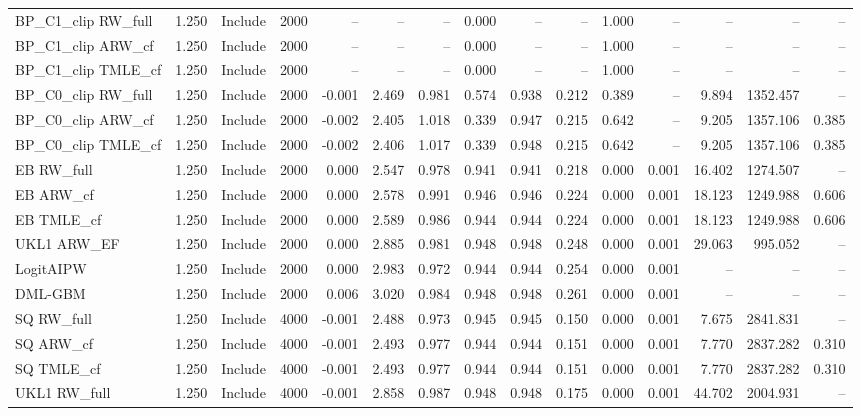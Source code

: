 \begin{tabular}{llllrrrrrrrrrrr}
BP\_C1\_clip RW\_full & 1.250 & Include & 2000 & -- & -- & -- & 0.000 & -- & -- & 1.000 & -- & -- & -- & -- \\
BP\_C1\_clip ARW\_cf & 1.250 & Include & 2000 & -- & -- & -- & 0.000 & -- & -- & 1.000 & -- & -- & -- & -- \\
BP\_C1\_clip TMLE\_cf & 1.250 & Include & 2000 & -- & -- & -- & 0.000 & -- & -- & 1.000 & -- & -- & -- & -- \\
BP\_C0\_clip RW\_full & 1.250 & Include & 2000 & -0.001 & 2.469 & 0.981 & 0.574 & 0.938 & 0.212 & 0.389 & -- & 9.894 & 1352.457 & -- \\
BP\_C0\_clip ARW\_cf & 1.250 & Include & 2000 & -0.002 & 2.405 & 1.018 & 0.339 & 0.947 & 0.215 & 0.642 & -- & 9.205 & 1357.106 & 0.385 \\
BP\_C0\_clip TMLE\_cf & 1.250 & Include & 2000 & -0.002 & 2.406 & 1.017 & 0.339 & 0.948 & 0.215 & 0.642 & -- & 9.205 & 1357.106 & 0.385 \\
EB RW\_full & 1.250 & Include & 2000 & 0.000 & 2.547 & 0.978 & 0.941 & 0.941 & 0.218 & 0.000 & 0.001 & 16.402 & 1274.507 & -- \\
EB ARW\_cf & 1.250 & Include & 2000 & 0.000 & 2.578 & 0.991 & 0.946 & 0.946 & 0.224 & 0.000 & 0.001 & 18.123 & 1249.988 & 0.606 \\
EB TMLE\_cf & 1.250 & Include & 2000 & 0.000 & 2.589 & 0.986 & 0.944 & 0.944 & 0.224 & 0.000 & 0.001 & 18.123 & 1249.988 & 0.606 \\
UKL1 ARW\_EF & 1.250 & Include & 2000 & 0.000 & 2.885 & 0.981 & 0.948 & 0.948 & 0.248 & 0.000 & 0.001 & 29.063 & 995.052 & -- \\
LogitAIPW & 1.250 & Include & 2000 & 0.000 & 2.983 & 0.972 & 0.944 & 0.944 & 0.254 & 0.000 & 0.001 & -- & -- & -- \\
DML-GBM & 1.250 & Include & 2000 & 0.006 & 3.020 & 0.984 & 0.948 & 0.948 & 0.261 & 0.000 & 0.001 & -- & -- & -- \\
SQ RW\_full & 1.250 & Include & 4000 & -0.001 & 2.488 & 0.973 & 0.945 & 0.945 & 0.150 & 0.000 & 0.001 & 7.675 & 2841.831 & -- \\
SQ ARW\_cf & 1.250 & Include & 4000 & -0.001 & 2.493 & 0.977 & 0.944 & 0.944 & 0.151 & 0.000 & 0.001 & 7.770 & 2837.282 & 0.310 \\
SQ TMLE\_cf & 1.250 & Include & 4000 & -0.001 & 2.493 & 0.977 & 0.944 & 0.944 & 0.151 & 0.000 & 0.001 & 7.770 & 2837.282 & 0.310 \\
UKL1 RW\_full & 1.250 & Include & 4000 & -0.001 & 2.858 & 0.987 & 0.948 & 0.948 & 0.175 & 0.000 & 0.001 & 44.702 & 2004.931 & -- \\

\end{tabular}
